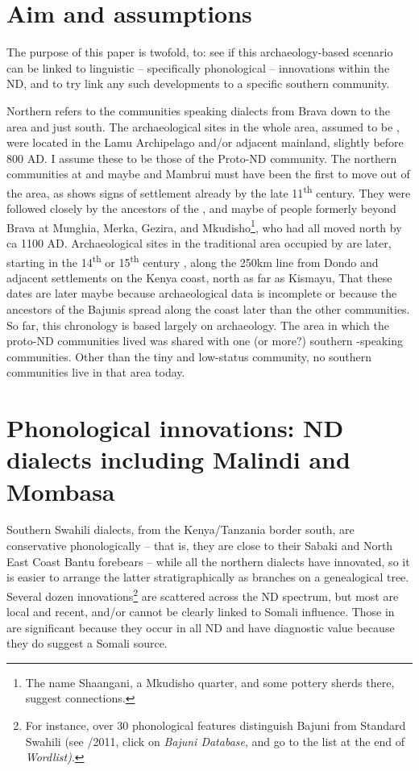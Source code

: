 \documentclass[output=paper,newtxmath,modfonts,nonflat,hidelinks]{langsci/langscibook}
\begin{document}
\section{Aim and assumptions}\label{sec:nurse:3} 

The purpose of this paper is twofold, to: see if this archaeology-based scenario can be linked to linguistic -- specifically phonological -- innovations within the ND, and to try link any such developments to a specific southern  community. 

Northern  refers to the communities speaking  dialects from Brava down to the  area and just south. The archaeological sites in the whole area, assumed to be , were located in the Lamu Archipelago and{\slash}or adjacent mainland, slightly before 800 AD. I assume these to be those of the Proto-ND community. The northern communities at  and maybe  and Mambrui must have been the first to move out of the area, as  shows signs of  settlement already by the late 11\textsuperscript{th} century. They were followed closely by the ancestors of the , and maybe of people formerly beyond Brava at Munghia, Merka, Gezira, and Mkudisho\footnote{The name Shaangani, a Mkudisho quarter, and some pottery sherds there, suggest  connections.}, who had all moved north by ca 1100 AD. Archaeological sites in the traditional area occupied by  are later, starting in the 14\textsuperscript{th} or 15\textsuperscript{th} century \citep[91]{Wilson1992}, along the 250km line from Dondo and adjacent settlements on the Kenya coast, north as far as Kismayu, That these dates are later maybe because archaeological data is incomplete or because the ancestors of the Bajunis spread along the coast later than the other communities. So far, this chronology is based largely on archaeology. The area in which the proto-ND communities lived was shared with one (or more?) southern -speaking communities. Other than the tiny and low-status  community, no southern  communities live in that area today. 

\section{Phonological innovations: ND dialects including Malindi and Mombasa}\label{sec:nurse:4} Southern Swahili dialects, from the Kenya/Tanzania border south, are conservative phonologically -- that is, they are close to their Sabaki and North East Coast Bantu forebears -- while all the northern dialects have innovated, so it is easier to arrange the latter stratigraphically as branches on a genealogical tree. Several dozen innovations\footnote{For instance, over 30 phonological features distinguish Bajuni from Standard Swahili (see \citealt{Nurse2013}/2011, click on \textit{Bajuni Database}, and go to the list at the end of \textit{Wordlist)}.}  are scattered across the ND spectrum, but most are local and recent, and/or cannot be clearly linked to Somali influence. Those in  are significant because they occur in all ND and have diagnostic value because they do suggest a Somali source.
 
\end{document}
